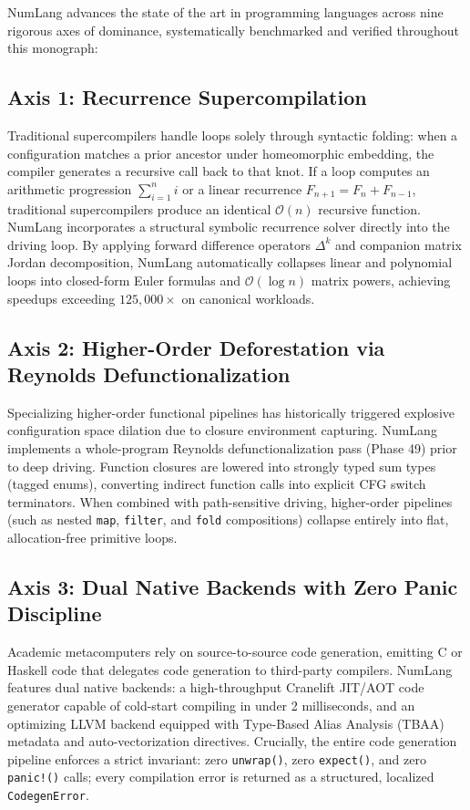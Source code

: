 NumLang advances the state of the art in programming languages across nine rigorous axes of dominance, systematically benchmarked and verified throughout this monograph:

\subsection{Axis 1: Recurrence Supercompilation}
Traditional supercompilers handle loops solely through syntactic folding: when a configuration matches a prior ancestor under homeomorphic embedding, the compiler generates a recursive call back to that knot. If a loop computes an arithmetic progression $\sum_{i=1}^n i$ or a linear recurrence $F_{n+1} = F_n + F_{n-1}$, traditional supercompilers produce an identical $\mathcal{O}(n)$ recursive function. NumLang incorporates a structural symbolic recurrence solver directly into the driving loop. By applying forward difference operators $\Delta^k$ and companion matrix Jordan decomposition, NumLang automatically collapses linear and polynomial loops into closed-form Euler formulas and $\mathcal{O}(\log n)$ matrix powers, achieving speedups exceeding $125,000\times$ on canonical workloads.

\subsection{Axis 2: Higher-Order Deforestation via Reynolds Defunctionalization}
Specializing higher-order functional pipelines has historically triggered explosive configuration space dilation due to closure environment capturing. NumLang implements a whole-program Reynolds defunctionalization pass (Phase 49) prior to deep driving. Function closures are lowered into strongly typed sum types (tagged enums), converting indirect function calls into explicit CFG switch terminators. When combined with path-sensitive driving, higher-order pipelines (such as nested \texttt{map}, \texttt{filter}, and \texttt{fold} compositions) collapse entirely into flat, allocation-free primitive loops.

\subsection{Axis 3: Dual Native Backends with Zero Panic Discipline}
Academic metacomputers rely on source-to-source code generation, emitting C or Haskell code that delegates code generation to third-party compilers. NumLang features dual native backends: a high-throughput Cranelift JIT/AOT code generator capable of cold-start compiling in under 2 milliseconds, and an optimizing LLVM backend equipped with Type-Based Alias Analysis (TBAA) metadata and auto-vectorization directives. Crucially, the entire code generation pipeline enforces a strict invariant: zero \texttt{unwrap()}, zero \texttt{expect()}, and zero \texttt{panic!()} calls; every compilation error is returned as a structured, localized \texttt{CodegenError}.

